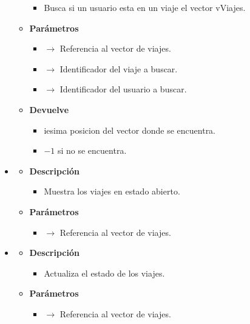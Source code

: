 \begin{itemize}
\begin{itemize}
\begin{itemize}
			\item  Busca si un usuario esta en un viaje el vector vViajes.
		\end{itemize}
		\item \textbf{Parámetros}
		\begin{itemize}
			\item {} $\rightarrow$ Referencia al vector de viajes.
            \item {} $\rightarrow$ Identificador del viaje a buscar.
            \item {} $\rightarrow$ Identificador del usuario a buscar.
		\end{itemize}
        \item \textbf{Devuelve}
		\begin{itemize}
			\item iesima posicion del vector donde se encuentra.
            \item $-1$ si no se encuentra.
		\end{itemize}
	\end{itemize}
    \item{}
    \begin{itemize}
        \item \textbf{Descripción}
        \begin{itemize}
			\item  Muestra los viajes en estado abierto.
		\end{itemize}
		\item \textbf{Parámetros}
		\begin{itemize}
			\item {}  $\rightarrow$ Referencia al vector de viajes.
		\end{itemize}
	\end{itemize}
    \item {}
    \begin{itemize}
        \item \textbf{Descripción}
        \begin{itemize}
			\item  Actualiza el estado de los viajes.
		\end{itemize}
		\item \textbf{Parámetros}
		\begin{itemize}
			\item {}  $\rightarrow$ Referencia al vector de viajes.
		\end{itemize}
	\end{itemize}
\end{itemize}
\newpage
